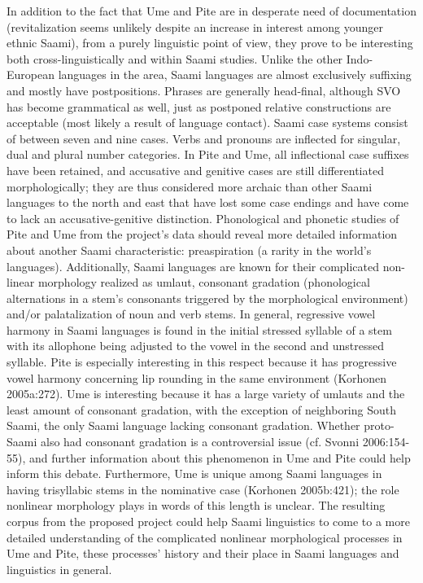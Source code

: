 \documentclass[a4paper,12pt]{article}
\begin{document}
In addition to the fact that Ume and Pite are in desperate need of documentation (revitalization seems unlikely despite an increase in interest among younger ethnic Saami), from a purely linguistic point of view, they prove to be interesting both cross-linguistically and within Saami studies. Unlike the other Indo-European languages in the area, Saami languages are almost exclusively suffixing and mostly have postpositions. Phrases are generally head-final, although SVO has become grammatical as well, just as postponed relative constructions are acceptable (most likely a result of language contact). Saami case systems consist of between seven and nine cases. Verbs and pronouns are inflected for singular, dual and plural number categories. In Pite and Ume, all inflectional case suffixes have been retained, and accusative and genitive cases are still differentiated morphologically; they are thus considered more archaic than other Saami languages to the north and east that have lost some case endings and have come to lack an accusative-genitive distinction. Phonological and phonetic studies of Pite and Ume from the project's data should reveal more detailed information about another Saami characteristic: preaspiration (a rarity in the world's languages). 
Additionally, Saami languages are known for their complicated non-linear morphology realized as umlaut, consonant gradation (phonological alternations in a stem's consonants triggered by the morphological environment) and/or palatalization of noun and verb stems. In general, regressive vowel harmony in Saami languages is found in the initial stressed syllable of a stem with its allophone being adjusted to the vowel in the second and unstressed syllable. Pite is especially interesting in this respect because it has progressive vowel harmony concerning lip rounding in the same environment (Korhonen 2005a:272). Ume is interesting because it has a large variety of umlauts and the least amount of consonant gradation, with the exception of neighboring South Saami, the only Saami language lacking consonant gradation. Whether proto-Saami also had consonant gradation is a controversial issue (cf. Svonni 2006:154-55), and further information about this phenomenon in Ume and Pite could help inform this debate. Furthermore, Ume is unique among Saami languages in having trisyllabic stems in the nominative case (Korhonen 2005b:421); the role nonlinear morphology plays in words of this length is unclear. The resulting corpus from the proposed project could help Saami linguistics to come to a more detailed understanding of the complicated nonlinear morphological processes in Ume and Pite, these processes' history and their place in Saami languages and linguistics in general.%
\end{document}
